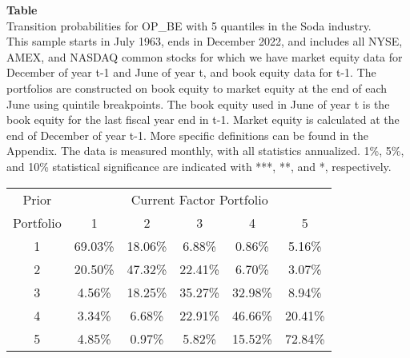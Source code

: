 \begin{table*}[ht!]
\raggedright
{}
\label{tab: transition_probs_OP_BE_Soda_with_5_quantiles}
\textbf{Table \thetable} \\
Transition probabilities for OP_BE with 5 quantiles in the Soda industry. \\
\hspace*{1em}This sample starts in July 1963, ends in December 2022, and includes all NYSE, AMEX, and NASDAQ common stocks for which we have market equity data for December of year t-1 and June of year t, and book equity data for t-1. The portfolios are constructed on book equity to market equity at the end of each June using quintile breakpoints.  The book equity used in June of year t is the book equity for the last fiscal year end in t-1.  Market equity is calculated at the end of December of year t-1.  More specific definitions can be found in the Appendix.  The data is measured monthly, with all statistics annualized.  1\%, 5\%, and 10\% statistical significance are indicated with ***, **, and *, respectively. \\
\vspace{0.5em}
\centering
\begin{adjustbox}{max width=\textwidth}
\begin{tabular}{@{}cccccc@{}}
\toprule
Prior & \multicolumn{5}{c}{Current Factor Portfolio} \\
Portfolio & 1 & 2 & 3 & 4 & 5 \\
\midrule
1 & 69.03\% & 18.06\% & 6.88\% & 0.86\% & 5.16\% \\
2 & 20.50\% & 47.32\% & 22.41\% & 6.70\% & 3.07\% \\
3 & 4.56\% & 18.25\% & 35.27\% & 32.98\% & 8.94\% \\
4 & 3.34\% & 6.68\% & 22.91\% & 46.66\% & 20.41\% \\
5 & 4.85\% & 0.97\% & 5.82\% & 15.52\% & 72.84\% \\
\bottomrule
\end{tabular}
\end{adjustbox}
\end{table*}